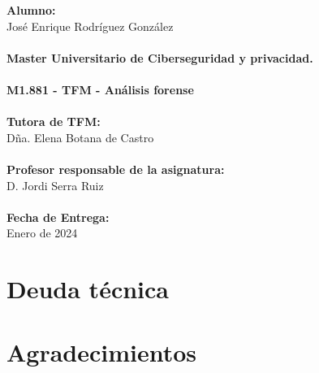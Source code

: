 \documentclass[12pt,a4paper]{report}
\begin{document}
\begin{titlepage}
\begin{minipage}{0.5\textwidth}
    \end{minipage}
    \begin{minipage}{0.5\textwidth}
        \textbf{Alumno:} \\
        {José Enrique Rodríguez González} \\
        \\
        \textbf{Master Universitario de Ciberseguridad y privacidad.} \\
        \\
        \textbf{M1.881 - TFM - Análisis forense} \\
        \\
        \textbf{Tutora de TFM:} \\
        {Dña. Elena Botana de Castro} \\
        \\
        \textbf{Profesor responsable de la asignatura:} \\
        {D. Jordi Serra Ruiz} \\
        \\
        \textbf{Fecha de Entrega:} \\
        {Enero de 2024}
    \end{minipage}

    \vfill %


\end{titlepage}
\restoregeometry


\newpage  %


\chapter*{Deuda técnica}  %

\clearpage


\chapter*{Agradecimientos}  %

\clearpage

\tableofcontents %

\newpage
{}
\end{document}

